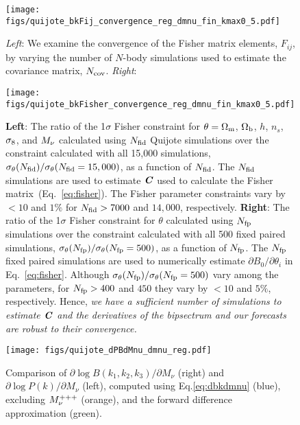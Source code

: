 \begin{figure}
\begin{center}
    \texttt{[image: figs/quijote\_bkFij\_convergence\_reg\_dmnu\_fin\_kmax0\_5.pdf]}
    \caption{
        {\em Left}: We examine the convergence of the Fisher matrix elements, $F_{ij}$, by varying
        the number of $N$-body simulations used to estimate the covariance matrix, $N_{\rm cov}$. 
        {\em Right}:
    }
\label{fig:fij_converge}
\end{center}
\end{figure}

\begin{figure}
\begin{center}
    \texttt{[image: figs/quijote\_bkFisher\_convergence\_reg\_dmnu\_fin\_kmax0\_5.pdf]} %
    \caption{{\bf Left}: The ratio of the 1$\sigma$ Fisher constraint for $\theta=\Omega_{\rm m}$, 
    $\Omega_{\rm b}$, $h$, $n_s$, $\sigma_8$, and $M_\nu$ calculated using $N_{\rm fid}$ Quijote 
    simulations over the constraint calculated with all 15,000 simulations, 
    $\sigma_\theta(N_{\rm fid})/\sigma_\theta(N_{\rm fid} = 15,000)$, as a 
    function of $N_{\rm fid}$. The $N_{\rm fid}$ simulations are used to estimate 
    $\textbf{\textit{C}}$ used to calculate the Fisher matrix~(Eq.~\ref{eq:fisher}). The Fisher
    parameter constraints vary by $<10$ and $1\%$ for $N_{\rm fid} > 7000$ and 
    $14,000$, respectively. 
    {\bf Right}: The ratio of the 1$\sigma$ Fisher constraint for $\theta$ 
    calculated using  $N_{\rm fp}$ simulations over the constraint calculated with 
    all 500 fixed paired simulations, $\sigma_\theta(N_{\rm fp})/\sigma_\theta(N_{\rm fp} = 500)$, 
    as a function of $N_{\rm fp}$. The $N_{\rm fp}$ fixed paired simulations are 
    used to numerically estimate $\partial B_0/\partial \theta_i$ in Eq.~\ref{eq:fisher}. 
    Although $\sigma_\theta(N_{\rm fp})/\sigma_\theta(N_{\rm fp} = 500)$ vary among 
    the parameters, for $N_{\rm fp} > 400$ and $450$ they vary by $< 10$ and $5\%$, 
    respectively. Hence, {\em we have a sufficient number of simulations to estimate 
    $\textbf{\textit{C}}$ and the derivatives of the bipsectrum and our forecasts are robust to 
    their convergence.} 
    }
\label{fig:converge}
\end{center}
\end{figure}

\begin{figure}
\begin{center}
    \texttt{[image: figs/quijote\_dPBdMnu\_dmnu\_reg.pdf]} 
    \caption{Comparison of $\partial \log B(k_1, k_2, k_3)/\partial M_\nu$ (right) 
    and $\partial \log P(k)/\partial M_\nu$ (left), computed using Eq.\ref{eq:dbkdmnu} (blue), 
    excluding $M_\nu^{+++}$ (orange), and the forward difference approximation (green). 
    }
\label{fig:dPBdmnu}
\end{center}
\end{figure}
